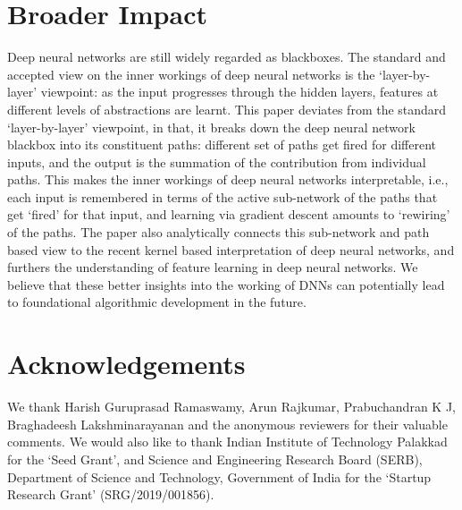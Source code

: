\documentclass{article}
\begin{document}
\section{Broader Impact}
Deep neural networks are still widely regarded as blackboxes. The standard and accepted view on the inner workings of  deep neural networks is the `layer-by-layer' viewpoint:  as the input progresses through the hidden layers, features at different levels of abstractions are learnt. This paper deviates from the standard `layer-by-layer' viewpoint, in that, it breaks down the deep neural network blackbox into its constituent paths: different set of paths get fired for different inputs, and the output is the summation of the contribution from individual paths. This makes the inner workings of deep neural networks interpretable, i.e., each input is remembered in terms of the active sub-network of the paths that get `fired' for that input, and learning via gradient descent amounts to `rewiring' of the paths. The paper also analytically connects this sub-network and path based view to the recent kernel based interpretation of deep neural networks, and furthers the understanding of feature learning in deep neural networks. We believe that these better insights into the working of DNNs  can potentially lead to foundational algorithmic development in the future.

\section*{Acknowledgements}
We thank Harish Guruprasad Ramaswamy, Arun Rajkumar, Prabuchandran K J, Braghadeesh Lakshminarayanan and the anonymous reviewers for their valuable comments. We would also like to thank Indian Institute of Technology Palakkad for the `Seed Grant', and Science and Engineering Research Board (SERB), Department of Science and Technology, Government of India for the `Startup Research Grant' (SRG/2019/001856). 




\end{document}
